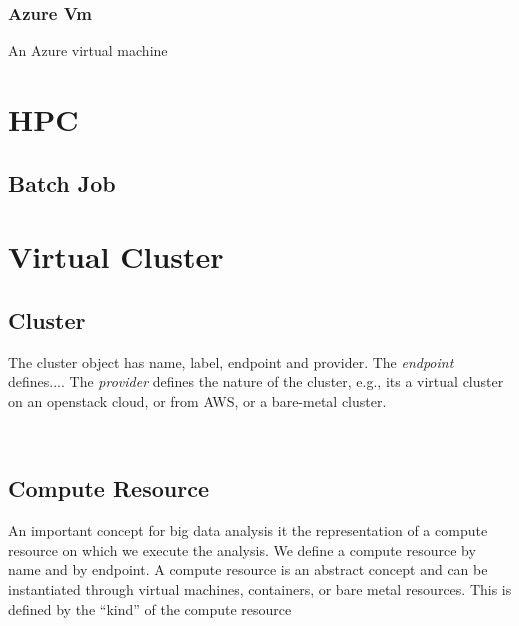 \documentclass[9pt,twocolumn,twoside]{styles/osajnl}
\begin{document}

\subsubsection{Azure Vm}

An Azure virtual machine



\section{HPC}

\subsection{Batch Job}


\section{Virtual Cluster}

\subsection{Cluster}

The cluster object has name, label, endpoint and provider. The
\textit{endpoint} defines....  The \textit{provider} defines the
nature of the cluster, e.g., its a virtual cluster on an openstack
cloud, or from AWS, or a bare-metal cluster.


\
\subsection{Compute Resource}

An important concept for big data analysis it the representation of a
compute resource on which we execute the analysis. We define a compute
resource by name and by endpoint. A compute resource is an abstract
concept and can be instantiated through virtual machines, containers,
or bare metal resources. This is defined by the “kind” of the compute
resource 
\end{document}
